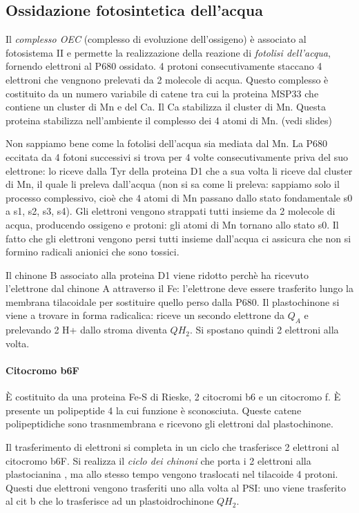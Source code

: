 \documentclass[a4paper,12pt]{book}
\begin{document}
\subsection{Ossidazione fotosintetica dell'acqua}
Il \emph{complesso OEC} (complesso di evoluzione dell'ossigeno) è associato al fotosistema II e permette la realizzazione della reazione di \emph{fotolisi dell'acqua}, fornendo elettroni al P680 ossidato. 4 protoni consecutivamente staccano 4 elettroni che vengnono prelevati da 2 molecole di acqua. Questo complesso è costituito da un numero variabile di catene tra cui la proteina MSP33 che contiene un cluster di Mn e del Ca. Il Ca stabilizza il cluster di Mn. Questa proteina stabilizza nell'ambiente il complesso dei 4 atomi di Mn. (vedi slides)

Non sappiamo bene come la fotolisi dell'acqua sia mediata dal Mn. La P680 eccitata da 4 fotoni successivi si trova per 4 volte consecutivamente priva del suo elettrone: lo riceve dalla Tyr della proteina D1 che a sua volta li riceve dal cluster di Mn, il quale li preleva dall'acqua (non si sa come li preleva: sappiamo solo il processo complessivo, cioè che 4 atomi di Mn passano dallo stato fondamentale s0 a s1, s2, s3, s4). Gli elettroni vengono strappati tutti insieme da 2 molecole di acqua, producendo ossigeno e protoni: gli atomi di Mn tornano allo stato s0. Il fatto che gli elettroni vengono persi tutti insieme dall'acqua ci assicura che non si formino radicali anionici che sono tossici.

Il chinone B associato alla proteina D1 viene ridotto perchè ha ricevuto l'elettrone dal chinone A attraverso il Fe: l'elettrone deve essere trasferito lungo la membrana tilacoidale per sostituire quello perso dalla P680. Il plastochinone si viene a trovare in forma radicalica: riceve un secondo elettrone da $Q_{A}$ e prelevando 2 H+ dallo stroma diventa $QH_{2}$. Si spostano quindi 2 elettroni alla volta.

\paragraph{Citocromo b6F}
È costituito da una proteina Fe-S di Rieske, 2 citocromi b6 e un citocromo f. È presente un polipeptide 4 la cui funzione è sconosciuta. Queste catene polipeptidiche sono trasnmembrana e ricevono gli elettroni dal plastochinone.

Il trasferimento di elettroni si completa in un ciclo che trasferisce 2 elettroni al citocromo b6F. Si realizza il \emph{ciclo dei chinoni} che porta i 2 elettroni alla plastocianina , ma allo stesso tempo vengono traslocati nel tilacoide 4 protoni. Questi due elettroni vengono trasferiti uno alla volta al PSI: uno viene trasferito al cit b che lo trasferisce ad un plastoidrochinone $QH_{2}$.
\end{document}

